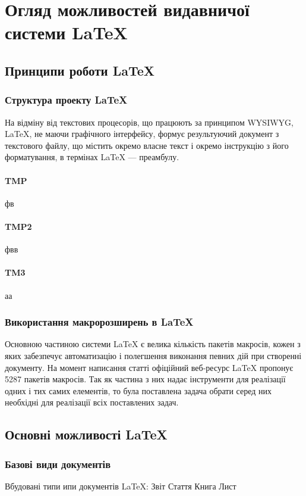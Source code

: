 \chapter{Огляд можливостей видавничої системи \LaTeX{} } 
\label{chapter:first}
%
%
%
%
%
\section{Принципи роботи \LaTeX{}}
%
%
\subsection{Структура проекту \LaTeX{}}
На   відміну   від   текстових   процесорів,   що   працюють   за   принципом WYSIWYG,  LaTeX,  не  маючи  графічного  інтерфейсу,  формує  результуючий документ з текстового файлу, що містить окремо власне текст і окремо інструкцію з його форматування, в термінах 
LaTeX --- преамбулу.
\subsubsection{TMP}
фв
\subsubsection{TMP2}
фвв
\subsubsection{TM3}
аа
%
%
\subsection{Використання макророзширень в \LaTeX{}}
Основною  частиною  системи  LaTeX  є  велика  кількість  пакетів  макросів, кожен  з  яких  забезпечує  автоматизацію  і  полегшення  виконання  певних  дій  при створенні  документу.  На  момент  написання  статті  офіційний  веб-ресурс  LaTeX пропонує  5287  пакетів  макросів.  Так як  частина  з  них  надає  інструменти  для реалізації  одних  і  тих  самих  елементів,  то  була  поставлена  задача  обрати  серед них  необхідні  для  реалізації  всіх  поставлених  задач. 
%
%
%
%
%
\section{Основні можливості \LaTeX{}}
%
%
\subsection{Базові види документів}
Вбудовані типи ипи документів LaTeX:
Звіт
Стаття
Книга
Лист
%
%
